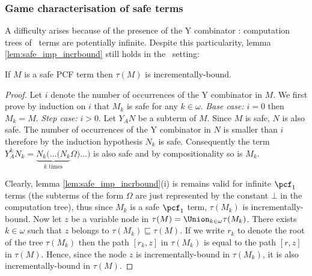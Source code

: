 \subsubsection{Game characterisation of safe terms}

A difficulty arises because of the presence of the Y combinator :
computation trees of \pcf\ terms are potentially infinite. Despite
this particularity, lemma \ref{lem:safe_imp_incrbound} still holds
in the \pcf\ setting:
\begin{lemma} \label{lem:pcf_safe_imp_incrbound} If $M$ is a safe
PCF term then $\tau(M)$ is incrementally-bound.
\end{lemma}
\begin{proof}
Let $i$ denote the number of occurrences of the Y combinator in $M$.
We first prove by induction on $i$ that $M_k$ is safe for any $k\in
\omega$. \emph{Base case:} $i=0$ then $M_k = M$. \emph{Step case:}
$i>0$. Let $Y_A N$ be a subterm of $M$. Since $M$ is safe, $N$ is
also safe. The number of occurrences of the Y combinator in $N$ is
smaller than $i$ therefore by the induction hypothesis $N_k$ is
safe. Consequently the term $Y_A^k N_k = \underbrace{N_k ( \ldots (
N_k}_{k \mbox{ times}} \Omega ) \ldots )$ is also safe and by
compositionality so is $M_k$.

Clearly, lemma \ref{lem:safe_imp_incrbound}(i) is remains valid for infinite
$\pcf_1$ terms (the subterms of the form $\Omega$ are just represented by
the constant $\bot$ in the computation tree), thus since $M_k$
is a safe $\pcf_1$ term, $\tau(M_k)$ is incrementally-bound.
Now let $z$ be a variable node in $\tau(M) =
\Union_{k\in\omega} \tau(M_k)$. There exists $k\in \omega$ such
that $z$ belongs to $\tau(M_k) \sqsubseteq \tau(M)$.
If we write $r_k$ to denote the root of the tree $\tau(M_k)$ then the path $[r_k,z]$ in $\tau(M_k)$ is equal to the path $[r,z]$ in $\tau(M)$.
Hence, since the node $z$ is incrementally-bound in $\tau(M_k)$,
it is also incrementally-bound in $\tau(M)$.
\end{proof}



